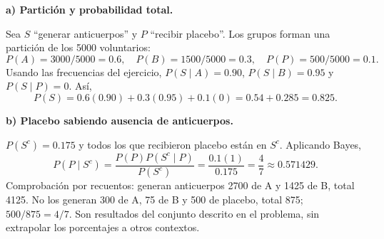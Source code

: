 \textbf{a) Partición y probabilidad total.}\par\nopagebreak[4]
Sea $S$ ``generar anticuerpos'' y $P$ ``recibir placebo''. Los grupos forman una partición de los 5000 voluntarios:
\[
P(A)=3000/5000=0.6,\quad P(B)=1500/5000=0.3,\quad P(P)=500/5000=0.1.
\]
Usando las frecuencias del ejercicio, $P(S\mid A)=0.90$, $P(S\mid B)=0.95$ y $P(S\mid P)=0$. Así,
\[
P(S)=0.6(0.90)+0.3(0.95)+0.1(0)=0.54+0.285=\boxed{0.825}.
\]

\textbf{b) Placebo sabiendo ausencia de anticuerpos.}\par\nopagebreak[4]
$P(S^c)=0.175$ y todos los que recibieron placebo están en $S^c$. Aplicando Bayes,
\[
P(P\mid S^c)=\frac{P(P)P(S^c\mid P)}{P(S^c)}
=\frac{0.1(1)}{0.175}=\boxed{\frac47\approx0.571429}.
\]
Comprobación por recuentos: generan anticuerpos 2700 de A y 1425 de B, total 4125. No los generan 300 de A, 75 de B y 500 de placebo, total 875; $500/875=4/7$. Son resultados del conjunto descrito en el problema, sin extrapolar los porcentajes a otros contextos.
